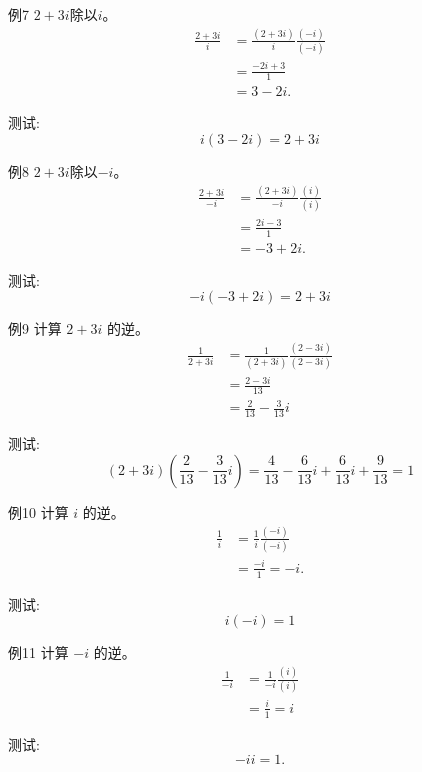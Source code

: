 例7 $2+3 i$除以$i$。
$$
\begin{aligned}
\frac{2+3 i}{i} & =\frac{(2+3 i)}{i} \frac{(-i)}{(-i)} \\
& =\frac{-2 i+3}{1} \\
& =3-2 i .
\end{aligned}
$$

测试:
$$
i(3-2 i)=2+3 i
$$

例8 $2+3 i$除以$-i$。
$$
\begin{aligned}
\frac{2+3 i}{-i} & =\frac{(2+3 i)}{-i} \frac{(i)}{(i)} \\
& =\frac{2 i-3}{1} \\
& =-3+2 i .
\end{aligned}
$$

测试:
$$
-i(-3+2 i)=2+3 i
$$

例9 计算 $2+3 i$ 的逆。
$$
\begin{aligned}
\frac{1}{2+3 i} & =\frac{1}{(2+3 i)} \frac{(2-3 i)}{(2-3 i)} \\
& =\frac{2-3 i}{13} \\
& =\frac{2}{13}-\frac{3}{13} i
\end{aligned}
$$

测试:
$$
(2+3 i)\left(\frac{2}{13}-\frac{3}{13} i\right)=\frac{4}{13}-\frac{6}{13} i+\frac{6}{13} i+\frac{9}{13}=1
$$

例10 计算 $i$ 的逆。
$$
\begin{aligned}
\frac{1}{i} & =\frac{1}{i} \frac{(-i)}{(-i)} \\
& =\frac{-i}{1}=-i .
\end{aligned}
$$

测试:
$$
i(-i)=1
$$

例11 计算 $-i$ 的逆。
$$
\begin{aligned}
\frac{1}{-i} & =\frac{1}{-i} \frac{(i)}{(i)} \\
& =\frac{i}{1}=i
\end{aligned}
$$

测试:
$$
-i i=1 .
$$
